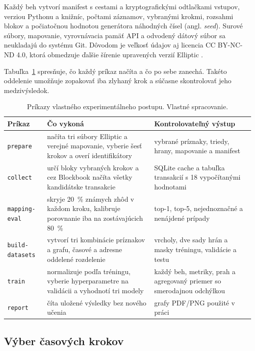 Každý beh vytvorí manifest s cestami a kryptografickými odtlačkami
vstupov, verziou Pythonu a knižníc, počtami záznamov, vybranými krokmi,
rozsahmi blokov a počiatočnou hodnotou generátora náhodných čísel
(angl. \emph{seed}). Surové súbory, mapovanie, vyrovnávacia pamäť API
a odvodený dátový súbor sa neukladajú do systému Git. Dôvodom je veľkosť
údajov aj licencia CC BY-NC-ND 4.0, ktorá obmedzuje ďalšie šírenie
upravených verzií Elliptic \cite{safar2026elliptic,ellipticDataset}.

Tabuľka~\ref{tab:own-pipeline-commands} spresňuje, čo každý príkaz
načíta a čo po sebe zanechá. Takéto oddelenie umožňuje zopakovať iba
zlyhaný krok a súčasne skontrolovať jeho medzivýsledok.

\begin{table}[p]
  \centering
  \small
  \caption{Príkazy vlastného experimentálneho postupu. Vlastné spracovanie.}
  \label{tab:own-pipeline-commands}
  \begin{tabularx}{\textwidth}{lXX}
    \toprule
    Príkaz & Čo vykoná & Kontrolovateľný výstup \\
    \midrule
    \texttt{prepare} & načíta tri súbory Elliptic a verejné mapovanie,
      vyberie šesť krokov a overí identifikátory & vybrané príznaky,
      triedy, hrany, mapovanie a manifest \\
    \texttt{collect} & určí bloky vybraných krokov a cez Blockbook
      načíta všetky kandidátske transakcie & SQLite cache a tabuľka
      transakcií s 18 vypočítanými hodnotami \\
    \texttt{mapping-eval} & skryje 20~\% známych zhôd v každom kroku,
      kalibruje porovnanie iba na zostávajúcich 80~\% & top-1, top-5,
      nejednoznačné a nenájdené prípady \\
    \texttt{build-datasets} & vytvorí tri kombinácie príznakov a grafu,
      časové a adresne oddelené rozdelenie & vrcholy, dve sady hrán a
      masky tréningu, validácie a testu \\
    \texttt{train} & normalizuje podľa tréningu, vyberie hyperparametre
      na validácii a vyhodnotí tri modely & každý beh, metriky, prah a
      agregovaný priemer so smerodajnou odchýlkou \\
    \texttt{report} & číta uložené výsledky bez nového učenia
      & grafy PDF/PNG použité v práci \\
    \bottomrule
  \end{tabularx}
\end{table}

\subsection{Výber časových krokov}

